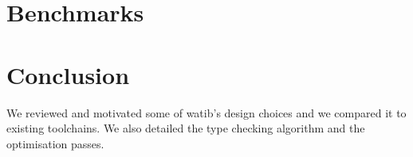 \documentclass[a4paper,11pt]{article}
\begin{document}


\section{Benchmarks}\label{bench}
\section{Conclusion}
We reviewed and motivated some of \textsf{watib}'s design choices and we
compared it to existing toolchains. We also detailed the type checking algorithm
and the optimisation passes.
\end{document}

